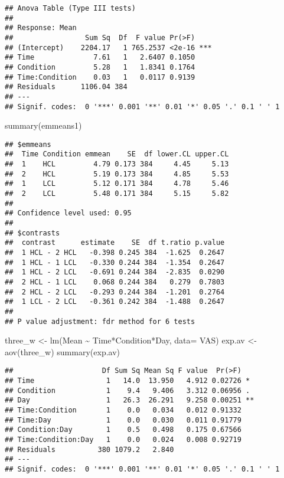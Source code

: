 \documentclass[
]{article}
\newenvironment{Shaded}{\begin{snugshade}}{\end{snugshade}}
\newcommand{\AttributeTok}[1]{\textcolor[rgb]{0.77,0.63,0.00}{#1}}
\newcommand{\FunctionTok}[1]{\textcolor[rgb]{0.00,0.00,0.00}{#1}}
\newcommand{\NormalTok}[1]{#1}
\newcommand{\OtherTok}[1]{\textcolor[rgb]{0.56,0.35,0.01}{#1}}
\newcommand{\SpecialCharTok}[1]{\textcolor[rgb]{0.00,0.00,0.00}{#1}}
\begin{document}
\begin{verbatim}
## Anova Table (Type III tests)
## 
## Response: Mean
##                 Sum Sq  Df  F value Pr(>F)    
## (Intercept)    2204.17   1 765.2537 <2e-16 ***
## Time              7.61   1   2.6407 0.1050    
## Condition         5.28   1   1.8341 0.1764    
## Time:Condition    0.03   1   0.0117 0.9139    
## Residuals      1106.04 384                    
## ---
## Signif. codes:  0 '***' 0.001 '**' 0.01 '*' 0.05 '.' 0.1 ' ' 1
\end{verbatim}

\begin{Shaded}
\begin{Highlighting}[]
\FunctionTok{summary}\NormalTok{(emmeans1)}
\end{Highlighting}
\end{Shaded}

\begin{verbatim}
## $emmeans
##  Time Condition emmean    SE  df lower.CL upper.CL
##  1    HCL         4.79 0.173 384     4.45     5.13
##  2    HCL         5.19 0.173 384     4.85     5.53
##  1    LCL         5.12 0.171 384     4.78     5.46
##  2    LCL         5.48 0.171 384     5.15     5.82
## 
## Confidence level used: 0.95 
## 
## $contrasts
##  contrast      estimate    SE  df t.ratio p.value
##  1 HCL - 2 HCL   -0.398 0.245 384  -1.625  0.2647
##  1 HCL - 1 LCL   -0.330 0.244 384  -1.354  0.2647
##  1 HCL - 2 LCL   -0.691 0.244 384  -2.835  0.0290
##  2 HCL - 1 LCL    0.068 0.244 384   0.279  0.7803
##  2 HCL - 2 LCL   -0.293 0.244 384  -1.201  0.2764
##  1 LCL - 2 LCL   -0.361 0.242 384  -1.488  0.2647
## 
## P value adjustment: fdr method for 6 tests
\end{verbatim}

\begin{Shaded}
\begin{Highlighting}[]
\NormalTok{three\_w }\OtherTok{\textless{}{-}} \FunctionTok{lm}\NormalTok{(Mean }\SpecialCharTok{\textasciitilde{}}\NormalTok{ Time}\SpecialCharTok{*}\NormalTok{Condition}\SpecialCharTok{*}\NormalTok{Day, }\AttributeTok{data=}\NormalTok{ VAS)}
\NormalTok{exp.av }\OtherTok{\textless{}{-}} \FunctionTok{aov}\NormalTok{(three\_w)}
\FunctionTok{summary}\NormalTok{(exp.av)}
\end{Highlighting}
\end{Shaded}

\begin{verbatim}
##                     Df Sum Sq Mean Sq F value  Pr(>F)   
## Time                 1   14.0  13.950   4.912 0.02726 * 
## Condition            1    9.4   9.406   3.312 0.06956 . 
## Day                  1   26.3  26.291   9.258 0.00251 **
## Time:Condition       1    0.0   0.034   0.012 0.91332   
## Time:Day             1    0.0   0.030   0.011 0.91779   
## Condition:Day        1    0.5   0.498   0.175 0.67566   
## Time:Condition:Day   1    0.0   0.024   0.008 0.92719   
## Residuals          380 1079.2   2.840                   
## ---
## Signif. codes:  0 '***' 0.001 '**' 0.01 '*' 0.05 '.' 0.1 ' ' 1
\end{verbatim}
\end{document}
